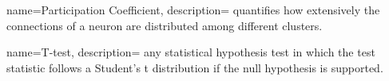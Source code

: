 {
  name=Participation Coefficient,
  description={ quantifies how extensively the connections of a neuron are distributed among different clusters.
  }
}

{
  name=T-test,
  description={ any statistical hypothesis test in which the test statistic follows a Student's t distribution if the null hypothesis is
supported.
  }
}





